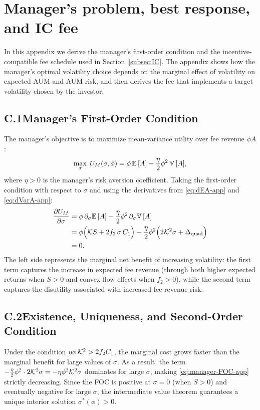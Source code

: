 \section{Manager's problem, best response, and IC fee}
\label{app:manager-solution}

In this appendix we derive the manager's first-order condition and the incentive-compatible fee schedule used in Section~\ref{subsec:IC}. The appendix shows how the manager's optimal volatility choice depends on the marginal effect of volatility on expected AUM and AUM risk, and then derives the fee that implements a target volatility chosen by the investor.

\subsection*{C.1\quad Manager's First-Order Condition}
The manager's objective is to maximize mean-variance utility over fee revenue $\phi A$:
\[
\max_\sigma \; U_M(\sigma,\phi) = \phi\,{\mathbb{E}}\,[A] - \frac{\eta}{2}\phi^2\,{\mathbb{V}}\,[A],
\]
where $\eta>0$ is the manager's risk aversion coefficient. Taking the first-order condition with respect to $\sigma$ and using the derivatives from \eqref{eq:dEA-app} and \eqref{eq:dVarA-app}:
\begin{align}
\frac{\partial U_M}{\partial \sigma} &= \phi\,\partial_\sigma {\mathbb{E}}\,[A] - \frac{\eta}{2}\phi^2\,\partial_\sigma {\mathbb{V}}\,[A] \nonumber\\
&= \phi\Big(\mathcal{K} S + 2 f_2\,\sigma\,C_1\Big) - \frac{\eta}{2}\phi^2\Big(2\mathcal{K}^2\sigma + \Delta_{\text{quad}}\Big) \nonumber\\
&= 0.\label{eq:manager-FOC-app}
\end{align}
The left side represents the marginal net benefit of increasing volatility: the first term captures the increase in expected fee revenue (through both higher expected returns when $S>0$ and convex flow effects when $f_2>0$), while the second term captures the disutility associated with increased fee-revenue risk.

\subsection*{C.2\quad Existence, Uniqueness, and Second-Order Condition}
Under the condition $\eta\phi\,\mathcal{K}^2 > 2f_2 C_1$, the marginal cost grows faster than the marginal benefit for large values of $\sigma$. As a result, the term $-\frac{\eta}{2}\phi^2\cdot 2\mathcal{K}^2\sigma = -\eta\phi^2\mathcal{K}^2\sigma$ dominates for large $\sigma$, making \eqref{eq:manager-FOC-app} strictly decreasing. Since the FOC is positive at $\sigma=0$ (when $S>0$) and eventually negative for large $\sigma$, the intermediate value theorem guarantees a unique interior solution $\sigma^*(\phi)>0$.

